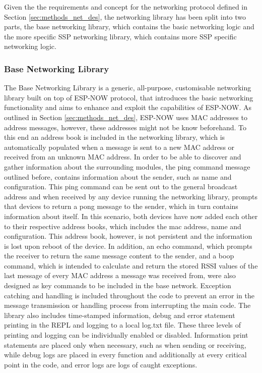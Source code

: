 
Given the the requirements and concept for the networking protocol defined in Section \ref{sec:methods_net_des}, the networking library has been split into two parts, the base networking library, which contains the basic networking logic and the more specific SSP networking library, which contains more SSP specific networking logic.

\subsubsection{\label{sec:methods_networking}Base Networking Library}


The Base Networking Library is a generic, all-purpose, customisable networking library built on top of ESP-NOW protocol, that introduces the basic networking functionality and aims to enhance and exploit the capabilities of ESP-NOW. As outlined in Section \ref{sec:methods_net_des}, ESP-NOW uses MAC addresses to address messages, however, these addresses might not be know beforehand. To this end an address book is included in the networking library, which is automatically populated when a message is sent to a new MAC address or received from an unknown MAC address. In order to be able to discover and gather information about the surrounding modules, the ping command message outlined before, contains information about the sender, such as name and configuration. This ping command can be sent out to the general broadcast address and when received by any device running the networking library, prompts that devices to return a pong message to the sender, which in turn contains information about itself. In this scenario, both devices have now added each other to their respective address books, which includes the mac address, name and configuration. This address book, however, is not persistent and the information is lost upon reboot of the device. In addition, an echo command, which prompts the receiver to return the same message content to the sender, and a boop command, which is intended to calculate and return the stored RSSI values of the last message of every MAC address a message was received from, were also designed as key commands to be included in the base network. Exception catching and handling is included throughout the code to prevent an error in the message transmission or handling process from interrupting the main code. The library also includes time-stamped information, debug and error statement printing in the REPL and logging to a local log.txt file. These three levels of printing and logging can be individually enabled or disabled. Information print statements are placed only when necessary, such as when sending or receiving, while debug logs are placed in every function and additionally at every critical point in the code, and error logs are logs of caught exceptions.\\

